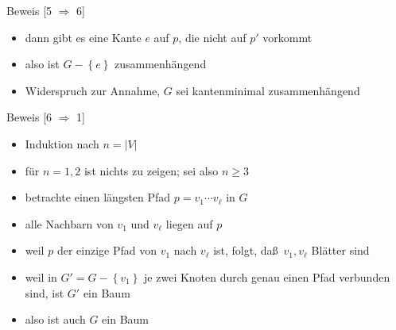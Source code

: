 \documentclass[aspectratio=1610, 11pt]{beamer}
\newcommand\cbc[1]{\left\{{#1}\right\}}
\begin{document}
\begin{frame}
\begin{overprint}
\begin{exampleblock}{Beweis \hfill[5 $\Rightarrow$ 6]}
\begin{itemize}
				\item dann gibt es eine Kante $e$ auf $p$, die nicht auf $p'$ vorkommt
				\item also ist $G-\cbc e$ zusammenh\"angend
				\item Widerspruch zur Annahme, $G$ sei kantenminimal zusammenh\"angend
			\end{itemize}
		\end{exampleblock}
		\begin{exampleblock}{Beweis \hfill[6 $\Rightarrow$ 1]}
			\begin{itemize}
				\item Induktion nach $n=|V|$
				\item f\"ur $n=1,2$ ist nichts zu zeigen; sei also $n\geq3$
				\item betrachte einen l\"angsten Pfad $p=v_1\cdots v_\ell$ in $G$
				\item alle Nachbarn von $v_1$ und $v_\ell$ liegen auf $p$
				\item weil $p$ der einzige Pfad von $v_1$ nach $v_\ell$ ist, folgt, da\ss\ $v_1,v_\ell$ Bl\"atter sind
				\item weil in $G'=G-\cbc{v_1}$ je zwei Knoten durch genau einen Pfad verbunden sind, ist $G'$ ein Baum
				\item also ist auch $G$ ein Baum
			\end{itemize}
		\end{exampleblock}
	\end{overprint}
\end{frame}
\end{document}
